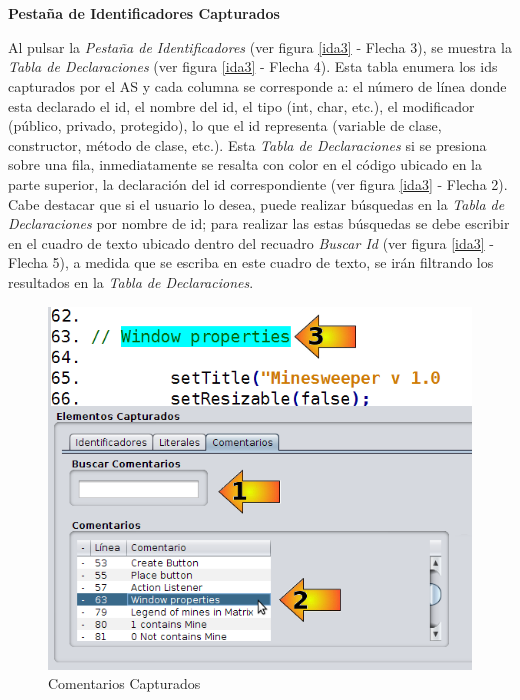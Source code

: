 \noindent \textbf{\\\\Pestaña de Identificadores Capturados\\} 

Al pulsar la \textit{Pestaña de Identificadores} (ver figura \ref{ida3} - Flecha 3), se muestra la \textit{Tabla de Declaraciones} (ver figura \ref{ida3} - Flecha 4). Esta tabla enumera los ids capturados por el AS y cada columna se corresponde a: el número de línea donde esta declarado el id, el nombre del id, el tipo (int, char, etc.), el modificador (público, privado, protegido), lo que el id representa (variable de clase, constructor, método de clase, etc.).
Esta \textit{Tabla de Declaraciones} si se presiona sobre una fila, inmediatamente se resalta con color en el código ubicado en la parte superior, la declaración del id correspondiente (ver figura \ref{ida3} - Flecha 2). 
Cabe destacar que si el usuario lo desea, puede realizar búsquedas en la \textit{Tabla de Declaraciones} por nombre de id; para realizar las estas búsquedas se debe escribir en el cuadro de texto ubicado dentro del recuadro \textit{Buscar Id} (ver figura \ref{ida3} - Flecha 5), a medida que se escriba en este cuadro de texto, se irán filtrando los resultados en la \textit{Tabla de Declaraciones}.

\begin{figure}[t] %
\centerline{%
\includegraphics[scale= 0.55]{./cap4/ida_05.png}
}
\caption{Comentarios Capturados}
\label{ida5}
\end{figure}

